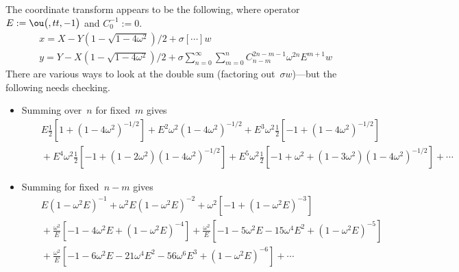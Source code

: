 The coordinate transform appears to be the following, where operator \(E:=\ou\big({},tt,-1\big)\) and \(C_0^{-1}:=0\).
\begin{eqnarray*}&&
x=X-Y(1-\sqrt{1-4\omega^2})/2
+\sigma\left[\cdots\right]w
\\&&
y=Y-X(1-\sqrt{1-4\omega^2})/2 
+\sigma \sum_{n=0}^\infty \sum_{m=0}^n C^{2n-m-1}_{n-m}\omega^{2n} E^{m+1} w
\end{eqnarray*}
There are various ways to look at the double sum (factoring out~\(\sigma w\))---but the following needs checking.
\begin{itemize}
\item Summing over~\(n\) for fixed~\(m\) gives
\begin{eqnarray*}&&
E\tfrac12\left[1+(1-4\omega^2)^{-1/2}\right]
+E^2\omega^2(1-4\omega^2)^{-1/2}
+E^3\omega^2\tfrac12\left[-1+(1-4\omega^2)^{-1/2}\right]
\\&&{}
+E^4\omega^2\tfrac12\left[-1+(1-2\omega^2)(1-4\omega^2)^{-1/2}\right]
+E^5\omega^2\tfrac12\left[-1+\omega^2+(1-3\omega^2)(1-4\omega^2)^{-1/2}\right]
+\cdots
\end{eqnarray*}
\item Summing for fixed~\(n-m\) gives
\begin{eqnarray*}&&
E(1-\omega^2E)^{-1}
+\omega^2E(1-\omega^2E)^{-2}
+\omega^2\left[-1+(1-\omega^2E)^{-3}\right]
\\&&{}
+\frac{\omega^2}E\left[-1-4\omega^2E +(1-\omega^2E)^{-4}\right]
+\frac{\omega^2}E\left[-1-5\omega^2E-15\omega^4E^2 +(1-\omega^2E)^{-5}\right]
\\&&{}
+\frac{\omega^2}E\left[-1-6\omega^2E-21\omega^4E^2-56\omega^6E^3 +(1-\omega^2E)^{-6}\right]
+\cdots
\end{eqnarray*}
\end{itemize}
 
